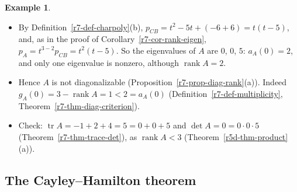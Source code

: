 \documentclass[12pt]{article}
\DeclareMathOperator{\tr}{tr}
\DeclareMathOperator{\rank}{rank}
\theoremstyle{definition}
\newtheorem{example}[theorem]{Example}
\begin{document}
\begin{example}
\begin{itemize}
\[\]
\item By Definition~\ref{r7-def-charpoly}(b), \(p_{CB}=t^2-5t+(-6+6)=t(t-5)\), and, as in the proof of
Corollary~\ref{r7-cor-rank-eigen}, \(p_A=t^{3-2}p_{CB}=t^2(t-5)\). So the eigenvalues of \(A\) are \(0\), \(0\), \(5\):
\(a_A(0)=2\), and only one eigenvalue is nonzero, although \(\rank A=2\).
\item Hence \(A\) is not diagonalizable (Proposition~\ref{r7-prop-diag-rank}(a)). Indeed
\(g_A(0)=3-\rank A=1<2=a_A(0)\) (Definition~\ref{r7-def-multiplicity}, Theorem~\ref{r7-thm-diag-criterion}).
\item Check: \(\tr A=-1+2+4=5=0+0+5\) and \(\det A=0=0\cdot0\cdot5\) (Theorem~\ref{r7-thm-trace-det}), as \(\rank A<3\)
(Theorem~\ref{r5d-thm-product}(a)).
\end{itemize}
\end{example}

\subsection*{The Cayley--Hamilton theorem}
\end{document}
